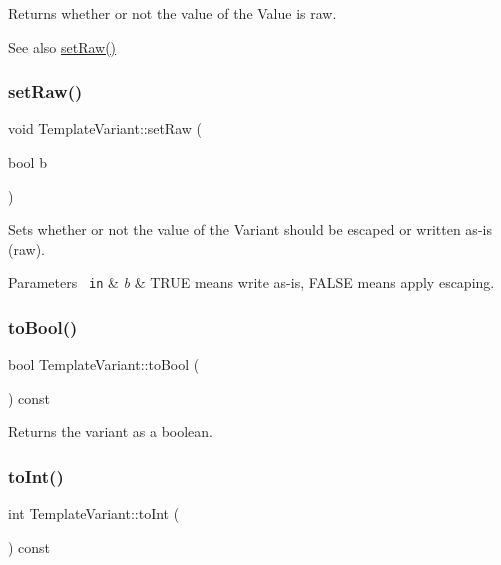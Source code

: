 Returns whether or not the value of the Value is raw. \begin{DoxySeeAlso}{See also}
\mbox{\hyperlink{class_template_variant_a3ca5dec8397f15321f13085ee5fefcc1}{set\+Raw()}} 
\end{DoxySeeAlso}
\mbox{\label{class_template_variant_a3ca5dec8397f15321f13085ee5fefcc1}} 
\subsubsection{\texorpdfstring{setRaw()}{setRaw()}}
{\footnotesize\ttfamily void Template\+Variant\+::set\+Raw (\begin{DoxyParamCaption}\item[{bool}]{b }\end{DoxyParamCaption})\hspace{0.3cm}{\ttfamily [inline]}}

Sets whether or not the value of the Variant should be escaped or written as-\/is (raw). 
\begin{DoxyParams}[1]{Parameters}
\mbox{\texttt{ in}}  & {\em b} & T\+R\+UE means write as-\/is, F\+A\+L\+SE means apply escaping. \\
\hline
\end{DoxyParams}
\mbox{\label{class_template_variant_a208563a3d54212cc15b4316a3c61e165}} 
\subsubsection{\texorpdfstring{toBool()}{toBool()}}
{\footnotesize\ttfamily bool Template\+Variant\+::to\+Bool (\begin{DoxyParamCaption}{ }\end{DoxyParamCaption}) const}

Returns the variant as a boolean. \mbox{\label{class_template_variant_a477cb7cb81a98abb837c414c3216ec58}} 
\subsubsection{\texorpdfstring{toInt()}{toInt()}}
{\footnotesize\ttfamily int Template\+Variant\+::to\+Int (\begin{DoxyParamCaption}{ }\end{DoxyParamCaption}) const}

